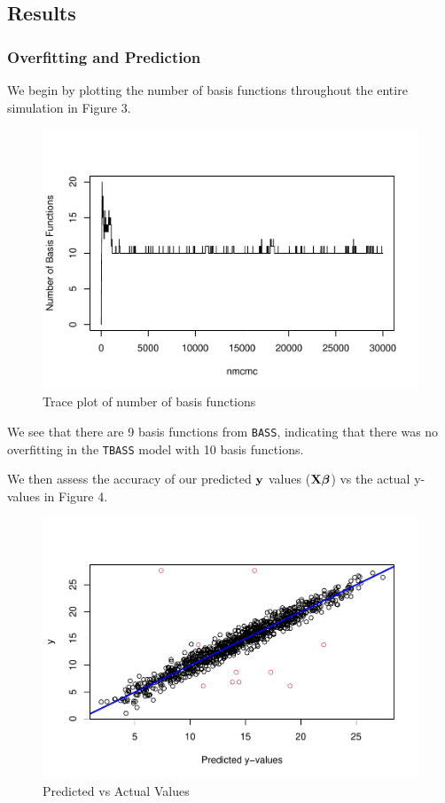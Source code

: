 \documentclass[
]{article}
\begin{document}
\hypertarget{results}{%
\subsection{Results}\label{results}}

\hypertarget{overfitting-and-prediction}{%
\subsubsection{Overfitting and
Prediction}\label{overfitting-and-prediction}}

We begin by plotting the number of basis functions throughout the entire
simulation in Figure 3.

\begin{figure}
\centering
\includegraphics{TBASS_vig_files/figure-latex/unnamed-chunk-11-1.pdf}
\caption{Trace plot of number of basis functions}
\end{figure}

We see that there are 9 basis functions from \texttt{BASS}, indicating
that there was no overfitting in the \texttt{TBASS} model with 10 basis
functions.

We then assess the accuracy of our predicted \(\bf y\) values
(\({\bf X}\boldsymbol\beta\)) vs the actual y-values in Figure 4.

\begin{figure}
\centering
\includegraphics{TBASS_vig_files/figure-latex/unnamed-chunk-12-1.pdf}
\caption{Predicted vs Actual Values}
\end{figure}
\end{document}
